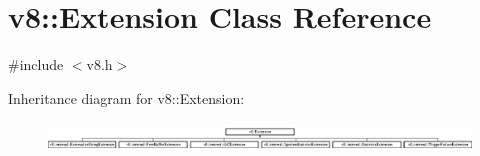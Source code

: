 \hypertarget{classv8_1_1_extension}{}\section{v8\+:\+:Extension Class Reference}
\label{classv8_1_1_extension}


{\ttfamily \#include $<$v8.\+h$>$}

Inheritance diagram for v8\+:\+:Extension\+:\begin{figure}[H]
\begin{center}
\leavevmode
\includegraphics[height=0.787623cm]{classv8_1_1_extension}
\end{center}
\end{figure}
